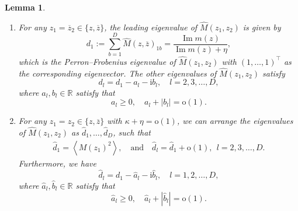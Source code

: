 \documentclass[10pt,reqno]{amsart}
\numberwithin{equation}{section}
\numberwithin{figure}{section}
\theoremstyle{plain} %
\newtheorem{lemma}[theorem]{Lemma}
\theoremstyle{definition} %
\newcommand{\wh}{\widehat}
\newcommand{\R}{\mathbb{R}}
\newcommand{\ii}{\mathrm{i}}
\renewcommand{\bar}{\overline}
\newcommand{\pa}[1]{\left({#1}\right)}
\newcommand{\avga}[1]{\left\langle #1 \right\rangle}
\DeclareMathOperator{\im}{\mathrm{Im}}
\newcommand{\be}{\begin{equation}}
\newcommand{\ee}{\end{equation}}
\newcommand{\oo}{\mathrm{o}}
\numberwithin{equation}{section}
\begin{document}
\begin{lemma}
\begin{enumerate}
        \item For any $z_1 = \bar z_2\in \{z,\bar z\}$, the leading eigenvalue of $\wh M\pa{z_1,z_2}$ is given by
        \be\label{sumwtM}
        d_1:=\sum_{b=1}^D  \wh M(z,\bar{z})_{1b}=\frac{\im m(z) }{\im m(z)+\eta}, 
        \ee
        which is the Perron–Frobenius eigenvalue of $\wh M(z_1,z_2)$ with $(1,\ldots, 1)^\top$ as the corresponding eigenvector. The other eigenvalues of $\wh M\pa{z_1,z_2}$ satisfy 
        \be\label{eq:otherM}
        d_l = d_1 - a_l - \ii b_l, \quad l=2,3,\ldots,D,
        \ee
        where $a_l,b_l\in \R$ satisfy that  
        \be\label{eq:akbk}
        a_l\ge 0,\quad a_l+|b_l|=\oo(1).
        \ee

        \item For any $z_1 = z_2\in \{z,\bar z\}$ with $\kappa+\eta=\oo\pa{1}$, we can arrange the eigenvalues of $\wh M\pa{z_1,z_2}$ as $\wh d_1,\ldots,\wh d_D$, such that
        \begin{equation}\nonumber
            \begin{aligned}
                \wh{d}_1=\avga{M(z_1)^2},\quad \text{and}\quad \wh{d}_l=\wh{d}_1+\oo\pa{1}, \ \ l=2,3,\ldots, D.
            \end{aligned}
        \end{equation}
        Furthermore, we have 
        \be\label{eq:otherM2}
        \wh d_l = d_1 - \wh a_l - \ii \wh b_l, \quad l=1,2,\ldots,D,
        \ee
        where $\wh a_l,\wh b_l\in \R$ satisfy that 
        \be\label{eq:akbk2}
        \wh a_l\ge 0,\quad \wh a_l+|\wh b_l|=\oo(1).
        \ee
        
    \end{enumerate}
\end{lemma}
\end{document}
